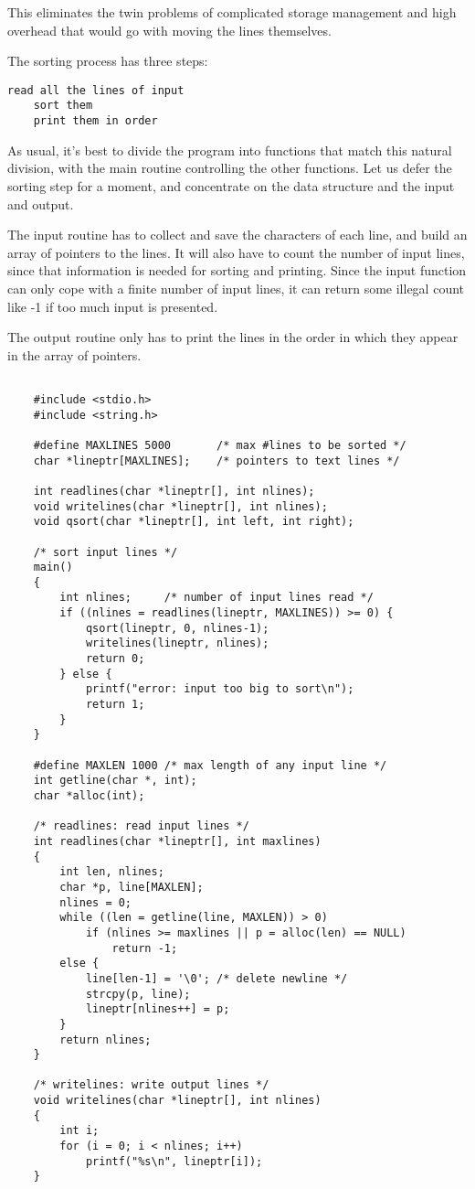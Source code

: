 This eliminates the twin problems of complicated storage management and high overhead that would go with moving the lines themselves.

The sorting process has three steps:
\begin{lstlisting}[basicstyle=\ttfamily\normalsize\itshape]
    read all the lines of input
    sort them
    print them in order
\end{lstlisting}
As usual, it's best to divide the program into functions that match this natural division, with the main routine controlling the other functions.
Let us defer the sorting step for a moment, and concentrate on the data structure and the input and output.

The input routine has to collect and save the characters of each line, and build an array of pointers to the lines. It will also have to count the number of input lines, since that information is needed for sorting and printing.
Since the input function can only cope with a finite number of input lines, it can return some illegal count like -1 if too much input is presented.

The output routine only has to print the lines in the order in which they appear in the array of pointers.

\begin{lstlisting}

    #include <stdio.h>
    #include <string.h>

    #define MAXLINES 5000       /* max #lines to be sorted */
    char *lineptr[MAXLINES];    /* pointers to text lines */

    int readlines(char *lineptr[], int nlines);
    void writelines(char *lineptr[], int nlines);
    void qsort(char *lineptr[], int left, int right);

    /* sort input lines */
    main()
    {
        int nlines;     /* number of input lines read */
        if ((nlines = readlines(lineptr, MAXLINES)) >= 0) {
            qsort(lineptr, 0, nlines-1);
            writelines(lineptr, nlines);
            return 0;
        } else {
            printf("error: input too big to sort\n");
            return 1;
        }
    }

    #define MAXLEN 1000 /* max length of any input line */
    int getline(char *, int);
    char *alloc(int);

    /* readlines: read input lines */
    int readlines(char *lineptr[], int maxlines)
    {
        int len, nlines;
        char *p, line[MAXLEN];
        nlines = 0;
        while ((len = getline(line, MAXLEN)) > 0)
            if (nlines >= maxlines || p = alloc(len) == NULL)
                return -1;
        else {
            line[len-1] = '\0'; /* delete newline */
            strcpy(p, line);
            lineptr[nlines++] = p;
        }
        return nlines;
    }

    /* writelines: write output lines */
    void writelines(char *lineptr[], int nlines)
    {
        int i;
        for (i = 0; i < nlines; i++)
            printf("%s\n", lineptr[i]);
    }

\end{lstlisting}

